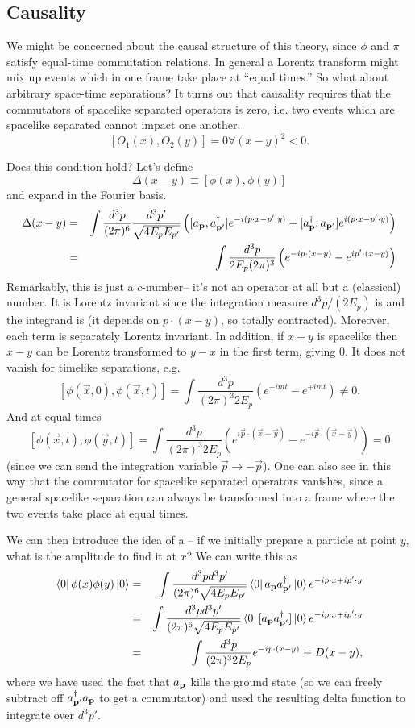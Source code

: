 \subsection*{Causality} We might be concerned about the causal structure of this theory, since $\phi$ and $\pi$ satisfy equal-time commutation relations. In general a Lorentz transform might mix up events which in one frame take place at ``equal times.'' So what about arbitrary space-time separations? It turns out that causality requires that the commutators of spacelike separated operators is zero, i.e. two events which are spacelike separated cannot impact one another.
$$[O_1(x),O_2(y)]=0 \forall (x-y)^2 <0.$$

Does this condition hold? Let's define
$$\Delta(x-y)\equiv [\phi(x),\phi(y)]$$
and expand in the Fourier basis.
\begin{eqnarray*}
\Delta(x-y) &=& \int \frac{d^3p}{(2\pi)^6} \frac{d^3p'}{\sqrt{4E_p E_{p'}}} \left([a_{\boldsymbol{\mathbf{p}}},a_{\boldsymbol{\mathbf{p}}'}^\dagger] e^{-i(p\cdot x - p' \cdot y)}+[a_{\boldsymbol{\mathbf{p}}}^\dagger, a_{\boldsymbol{\mathbf{p}}'}] e^{i(p\cdot x-p' \cdot y)}\right)\\
&=& \int \frac{d^3p}{2E_p(2\pi)^3}\left(e^{-ip\cdot (x-y)}-e^{i p' \cdot (x-y)}\right)
\end{eqnarray*}
Remarkably, this is just a $c$-number-- it's not an operator at all but a (classical) number. It is Lorentz invariant since the integration measure $d^3p/(2E_p)$ is and the integrand is (it depends on $p\cdot (x-y)$, so totally contracted). Moreover, each term is separately Lorentz invariant. In addition, if $x-y$ is spacelike then $x-y$ can be Lorentz transformed to $y-x$ in the first term, giving $0$. It does not vanish for timelike separations, e.g.
$$[\phi (\vec x,0), \phi(\vec x,t)] = \int \frac{d^3p}{(2\pi)^3 2 E_p}(e^{-imt}-e^{+imt})\neq 0.$$
And at equal times 
$$[\phi(\vec x,t),\phi(\vec y, t)]=\int \frac{d^3p}{(2\pi)^3 2E_p}(e^{i\vec p \cdot (\vec x - \vec y)}- e^{-i \vec p \cdot (\vec x- \vec y)})=0$$
(since we can send the integration variable $\vec p\to -\vec p$). One can also see in this way that the commutator for spacelike separated operators vanishes, since a general spacelike separation can always be transformed into a frame where the two events take place at equal times.

\begin{defn}
We can then introduce the idea of a -- if we initially prepare a particle at point $y$, what is the amplitude to find it at $x$? We can write this as
\begin{eqnarray*}
\left< 0 \right|\phi(x) \phi(y)\left| 0 \right>&=&\int \frac{d^3p d^3 p'}{(2\pi)^6\sqrt{4 E_p E_{p'}}} \left< 0 \right| a_{\boldsymbol{\mathbf{p}}} a_{\boldsymbol{\mathbf{p}}'}^\dagger \left| 0 \right>e^{-ip \cdot x +i p'\cdot y}\\
&=&\int \frac{d^3p d^3 p'}{(2\pi)^6\sqrt{4 E_p E_{p'}}} \left< 0 \right| [a_{\boldsymbol{\mathbf{p}}} a_{\boldsymbol{\mathbf{p}}'}^\dagger] \left| 0 \right>e^{-ip \cdot x +i p'\cdot y}\\
&=&\int \frac{d^3p}{(2\pi)^3 2 E_p}e^{-ip\cdot (x-y)} \equiv D(x-y),
\end{eqnarray*}
where we have used the fact that $a_{\boldsymbol{\mathbf{p}}}$ kills the ground state (so we can freely subtract off $a_{\boldsymbol{\mathbf{p}}'}^\dagger a_{\boldsymbol{\mathbf{p}}}$ to get a commutator) and used the resulting delta function to integrate over $d^3p'$.
\end{defn}

